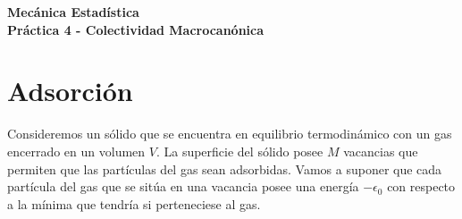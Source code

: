 \documentclass[a4paper,11pt]{article}
\begin{document}
\pagestyle{fancy}
\chead{\small \the\year}



\thispagestyle{plain}
\begin{center}
    \textbf{\large
        Mecánica Estadística \\
        Práctica 4 - Colectividad Macrocanónica
    }
\end{center}
\vspace{-1.5em}




\section{Adsorción}

Consideremos un sólido que se encuentra en equilibrio termodinámico con un
gas encerrado en un volumen $V$.
La superficie del sólido posee $M$ vacancias que permiten que las partículas
del gas sean adsorbidas. Vamos a suponer que cada partícula del gas que se
sitúa en una vacancia posee una energía $-\epsilon_0$ con respecto a la mínima
que tendría si perteneciese al gas.
\end{document}
